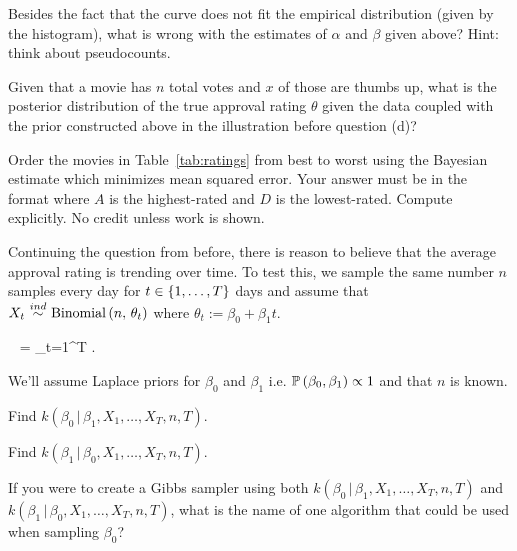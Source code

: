 \documentclass[12pt]{article}
\begin{document}
 Besides the fact that the curve does not fit the empirical distribution (given by the histogram), what is wrong with the estimates of $\alpha$ and $\beta$ given above? Hint: think about pseudocounts.  %

 Given that a movie has $n$ total votes and $x$ of those are thumbs up, what is the posterior distribution of the true approval rating $\theta$ given the data coupled with the prior constructed above in the illustration before question (d)? %

 Order the movies in Table~\ref{tab:ratings} from best to worst using the Bayesian estimate which minimizes mean squared error. Your answer must be in the format  where $A$ is the highest-rated and $D$ is the lowest-rated. Compute explicitly. No credit unless work is shown.  
\eenum

\problem Continuing the question from before, there is reason to believe that the average approval rating is trending over time. To test this, we sample the same number $n$ samples every day for $t \in \left\{1, \ldots, T\right\}$ days and assume that $X_t \inddist \binomial{n}{\theta_t}$ where $\theta_t := \beta_0 + \beta_1 t$.

\beqn
{}~ = \prod_{t=1}^T   .
\eeqn

\noindent We'll assume Laplace priors for $\beta_0$ and $\beta_1$ i.e. $\mathbb{P}\left(\beta_0, \beta_1\right) \propto 1$ and that $n$ is known.



\benum

 Find $k(\beta_0\,|\, \beta_1, X_1, \ldots, X_T, n, T)$. 

 Find $k(\beta_1\,|\, \beta_0, X_1, \ldots, X_T, n, T)$. 

 If you were to create a Gibbs sampler using both $k(\beta_0\,|\, \beta_1, X_1, \ldots, X_T, n, T)$ and $k(\beta_1\,|\, \beta_0, X_1, \ldots, X_T, n, T)$, what is the name of one algorithm that could be used when sampling $\beta_0$? 

\eenum
\end{document}
